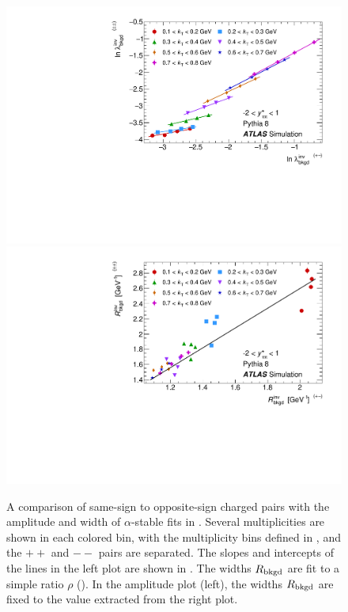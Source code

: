 \begin{figure}[t]
\begin{minipage}[t]{1.0\textwidth}
\centering
\includegraphics[width=.49\linewidth]{qinv_pythia8_backLambda_kt_opp_vs_same.pdf}
\includegraphics[width=.49\linewidth]{qinv_pythia8_backR_kt_opp_vs_same.pdf}
\end{minipage}
\caption{A comparison of same-sign to opposite-sign charged pairs with the amplitude and width of $\alpha$-stable fits in . Several multiplicities are shown in each colored \kt bin, with the multiplicity bins defined in , and the $++$ and $--$ pairs are separated. The slopes and intercepts of the lines in the left plot are shown in . The widths $R_{\mathrm{bkgd}}$ are fit to a simple ratio $\rho$ (). In the amplitude plot (left), the widths $R_{\mathrm{bkgd}}$ are fixed to the value extracted from the right plot.}
\label{fig:background_qinv_same_vs_opp_pythia8}
\end{figure}

